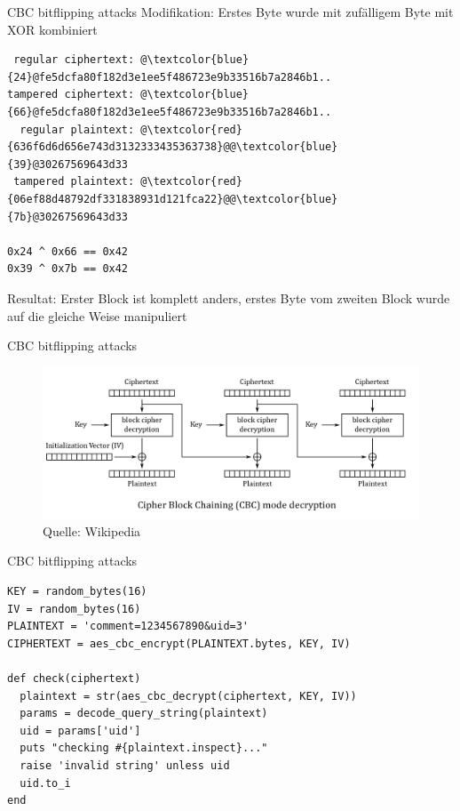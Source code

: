 \documentclass[presentation]{beamer}
\begin{document}
\begin{frame}[fragile,label={sec:orgfaf3fbc}]{CBC bitflipping attacks}
 Modifikation: Erstes Byte wurde mit zufälligem Byte mit XOR kombiniert

\begin{verbatim}
 regular ciphertext: @\textcolor{blue}{24}@fe5dcfa80f182d3e1ee5f486723e9b33516b7a2846b1..
tampered ciphertext: @\textcolor{blue}{66}@fe5dcfa80f182d3e1ee5f486723e9b33516b7a2846b1..
  regular plaintext: @\textcolor{red}{636f6d6d656e743d3132333435363738}@@\textcolor{blue}{39}@30267569643d33
 tampered plaintext: @\textcolor{red}{06ef88d48792df331838931d121fca22}@@\textcolor{blue}{7b}@30267569643d33

0x24 ^ 0x66 == 0x42
0x39 ^ 0x7b == 0x42
\end{verbatim}

Resultat: Erster Block ist komplett anders, erstes Byte vom zweiten
Block wurde auf die gleiche Weise manipuliert
\end{frame}

\begin{frame}[label={sec:org2b74a38}]{CBC bitflipping attacks}
\begin{figure}[htbp]
\centering
\includegraphics[width=.9\linewidth]{./img/cbc_decryption.png}
\caption{Quelle: Wikipedia}
\end{figure}
\end{frame}

\begin{frame}[fragile,label={sec:orga3a0235}]{CBC bitflipping attacks}
 \begin{verbatim}
KEY = random_bytes(16)
IV = random_bytes(16)
PLAINTEXT = 'comment=1234567890&uid=3'
CIPHERTEXT = aes_cbc_encrypt(PLAINTEXT.bytes, KEY, IV)

def check(ciphertext)
  plaintext = str(aes_cbc_decrypt(ciphertext, KEY, IV))
  params = decode_query_string(plaintext)
  uid = params['uid']
  puts "checking #{plaintext.inspect}..."
  raise 'invalid string' unless uid
  uid.to_i
end
\end{verbatim}
\end{frame}
\end{document}
